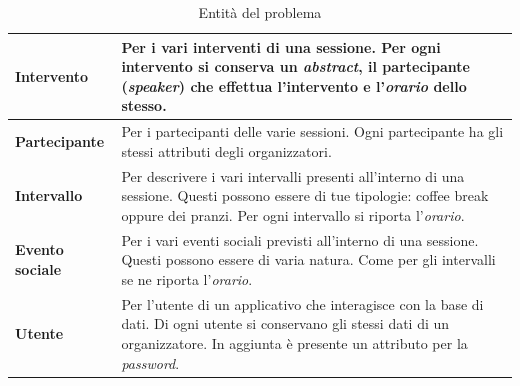 \begin{table}[h!]
\begin{tabularx}{\textwidth}{|l|X|}
\textbf{Intervento} & Per i vari interventi di una sessione. Per ogni intervento si conserva un \textit{abstract}, il partecipante (\textit{speaker}) che effettua l'intervento e l'\textit{orario} dello stesso. \\ \hline
\textbf{Partecipante} & Per i partecipanti delle varie sessioni. Ogni partecipante ha gli stessi attributi degli organizzatori. \\ \hline
\textbf{Intervallo} & Per descrivere i vari intervalli presenti all'interno di una sessione. Questi possono essere di tue tipologie: coffee break oppure dei pranzi. Per ogni intervallo si riporta l'\textit{orario}. \\ \hline
\textbf{Evento sociale} & Per i vari eventi sociali previsti all'interno di una sessione. Questi possono essere di varia natura. Come per gli intervalli se ne riporta l'\textit{orario}. \\ \hline
\textbf{Utente} & Per l'utente di un applicativo che interagisce con la base di dati. Di ogni utente si conservano gli stessi dati di un organizzatore. In aggiunta è presente un attributo per la \textit{password}. \\
\hline
\end{tabularx}
\caption{Entità del problema}\label{tab:entities}
\end{table}
\newpage
